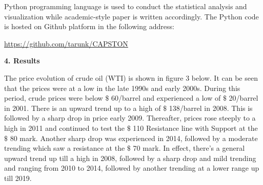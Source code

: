 \documentclass[12pt,twoside]{article}
\begin{document}
\begin{justify}
{\fontsize{11pt}{13.2pt}\selectfont Python programming language is used to conduct the statistical analysis and visualization while academic-style paper is written accordingly. The Python code is hosted on Github platform in the following address: \par}
\end{justify}\par

\begin{justify}
{\fontsize{11pt}{13.2pt}\selectfont \href{https://github.com/tarunk/CAPSTON}{https://github.com/tarunk/CAPSTON} \par}
\end{justify}\par


\vspace{\baselineskip}
\vspace{\baselineskip}\begin{justify}
{\fontsize{13pt}{15.6pt}\selectfont \textbf{4. Results}\par}
\end{justify}\par

{\fontsize{11pt}{13.2pt}\selectfont \par}
\par

\begin{justify}
{\fontsize{11pt}{13.2pt}\selectfont The price evolution of crude oil (WTI) is shown in figure 3 below. It can be seen that the prices were at a low in the late 1990s and early 2000s. During this period, crude prices were below $\$$ 60/barrel and experienced a low of $\$$ 20/barrel in 2001. There is an upward trend up to a high of $\$$ 138/barrel in 2008. This is followed by a sharp drop in price early 2009. Thereafter, prices rose steeply to a high in 2011 and continued to test the $\$$ 110 Resistance line with Support at the $\$$ 80 mark. Another sharp drop was experienced in 2014, followed by a moderate trending which saw a resistance at the $\$$ 70 mark.  In effect, there’s a general upward trend up till a high in 2008, followed by a sharp drop and mild trending and ranging from 2010 to 2014, followed by another trending at a lower range up till 2019.\par}
\end{justify}\par
\end{document}
